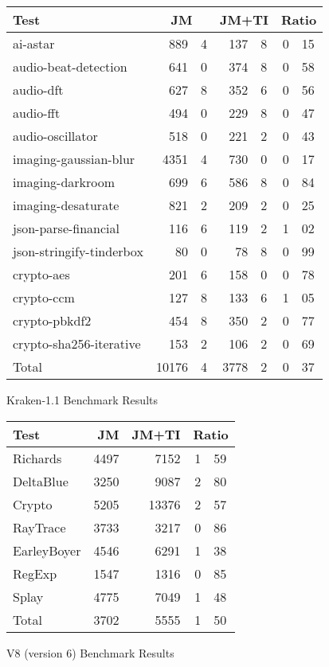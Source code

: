 \begin{figure}
\begin{center}
\begin{tabular}{lr@{.}lr@{.}lr@{.}l}

\toprule

Test & \multicolumn{2}{c}{JM}
     & \multicolumn{2}{c}{JM+TI}
     & \multicolumn{2}{c}{Ratio} \\

\midrule

ai-astar & 889&4 & 137&8 & 0&15 \\
audio-beat-detection & 641&0 & 374&8 & 0&58 \\
audio-dft & 627&8 & 352&6 & 0&56 \\
audio-fft & 494&0 & 229&8 & 0&47 \\
audio-oscillator & 518&0 & 221&2 & 0&43 \\
imaging-gaussian-blur & 4351&4 & 730&0 & 0&17 \\
imaging-darkroom & 699&6 & 586&8 & 0&84 \\
imaging-desaturate & 821&2 & 209&2 & 0&25 \\
json-parse-financial & 116&6 & 119&2 & 1&02 \\
json-stringify-tinderbox & 80&0 & 78&8 & 0&99 \\
crypto-aes & 201&6 & 158&0 & 0&78 \\
crypto-ccm & 127&8 & 133&6 & 1&05 \\
crypto-pbkdf2 & 454&8 & 350&2 & 0&77 \\
crypto-sha256-iterative & 153&2 & 106&2 & 0&69 \\
\midrule
Total & 10176&4 & 3778&2 & 0&37 \\
\bottomrule
\end{tabular}
\end{center}
\nocaptionrule \caption{Kraken-1.1 Benchmark Results}
\end{figure}

\begin{figure}
\begin{center}
\begin{tabular}{lrrr@{.}l}
\toprule
Test & JM & JM+TI & \multicolumn{2}{c}{Ratio} \\
\midrule
Richards & 4497 & 7152 & 1&59 \\
DeltaBlue & 3250 & 9087 & 2&80 \\
Crypto & 5205 & 13376 & 2&57 \\
RayTrace & 3733 & 3217 & 0&86 \\
EarleyBoyer & 4546 & 6291 & 1&38 \\
RegExp & 1547 & 1316 & 0&85 \\
Splay & 4775 & 7049 & 1&48 \\
\midrule
Total & 3702 & 5555 & 1&50 \\
\bottomrule
\end{tabular}
\end{center}
\nocaptionrule \caption{V8 (version 6) Benchmark Results}
\end{figure}

